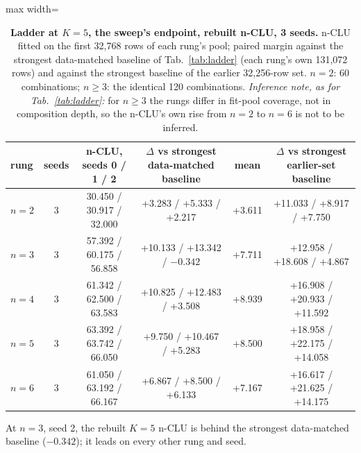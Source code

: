 \documentclass{article} %
\begin{document}
\begin{table}[h]
\centering\small
\caption{\textbf{Ladder at $K=5$, the sweep's endpoint, rebuilt n-CLU, 3 seeds.} n-CLU fitted on the %
first 32,768 rows of each rung's pool; paired margin against the strongest data-matched baseline of %
Tab.~\ref{tab:ladder} (each rung's own 131,072 rows) and against the strongest baseline of the earlier %
32,256-row set. $n=2$: 60 combinations; $n\ge3$: the identical 120 combinations. \emph{Inference note, as for %
Tab.~\ref{tab:ladder}:} for $n\ge3$ the rungs differ in fit-pool coverage, not in composition
depth, so the n-CLU's own rise from $n=2$ to $n=6$ is not to be inferred.}
\label{tab:k5}
\setlength{\tabcolsep}{2.4pt}
\begin{adjustbox}{max width=\linewidth}\begin{tabular}{lccccc}
\toprule
rung & seeds & n-CLU, seeds 0 / 1 / 2 & $\Delta$ vs strongest data-matched baseline & mean & $\Delta$ vs strongest earlier-set baseline \\
\midrule
$n=2$ & 3 & 30.450 / 30.917 / 32.000 & +3.283 / +5.333 / +2.217 & +3.611 & +11.033 / +8.917 / +7.750 \\
$n=3$ & 3 & 57.392 / 60.175 / 56.858 & +10.133 / +13.342 / $-0.342$ & +7.711 & +12.958 / +18.608 / +4.867 \\
$n=4$ & 3 & 61.342 / 62.500 / 63.583 & +10.825 / +12.483 / +3.508 & +8.939 & +16.908 / +20.933 / +11.592 \\
$n=5$ & 3 & 63.392 / 63.742 / 66.050 & +9.750 / +10.467 / +5.283 & +8.500 & +18.958 / +22.175 / +14.058 \\
$n=6$ & 3 & 61.050 / 63.192 / 66.167 & +6.867 / +8.500 / +6.133 & +7.167 & +16.617 / +21.625 / +14.175 \\
\bottomrule
\end{tabular}\end{adjustbox}
\end{table}

\noindent At $n=3$, seed 2, the rebuilt $K=5$ n-CLU is behind the strongest data-matched baseline %
($-0.342$); it leads on every other rung and seed. %
\end{document}

